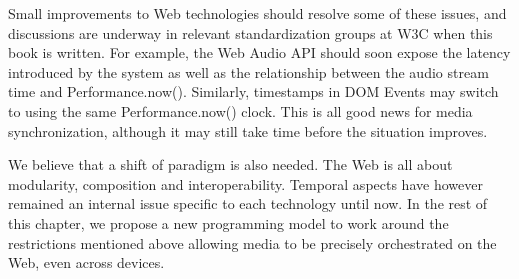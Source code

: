 Small improvements to Web technologies should resolve some of these issues,
and discussions are underway in relevant standardization groups at W3C when
this book is written. For example, the Web Audio API should soon expose the
latency introduced by the system as well as the relationship between the audio
stream time and Performance.now(). Similarly, timestamps in DOM Events may
switch to using the same Performance.now() clock. This is all good news for
media synchronization, although it may still take time before the situation
improves.

We believe that a shift of paradigm is also needed. The Web is all about
modularity, composition and interoperability. Temporal aspects have however
remained an internal issue specific to each technology until now. In the rest
of this chapter, we propose a new programming model to work around the
restrictions mentioned above allowing media to be precisely orchestrated on
the Web, even across devices.





